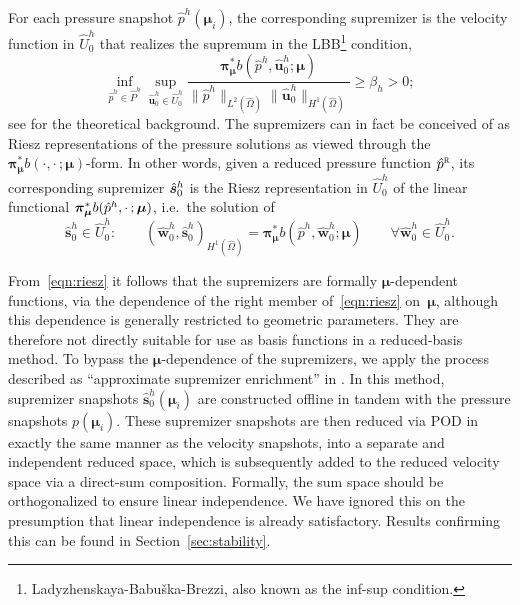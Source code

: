 \documentclass[onecolumn, twoside, a4paper, 11pt]{article}
\begin{document}
For each pressure snapshot $\hat{p}^h(\bm{\mu}_i)$, the corresponding supremizer is the
velocity function in $\hat{U}^h_0$ that realizes the supremum in the
LBB\footnote{Ladyzhenskaya-Babu\v{s}ka-Brezzi, also known as the inf-sup condition.} condition,
%
\begin{equation}
  \label{eqn:lbb}
  \inf_{\hat{p}^h \in \hat{P}^h} \sup_{\hat{\bm u}_0^h \in \hat{U}_0^h}
  \frac{\bm{\pi}^*_{\bm{\mu}}b(\hat{p}^h, \hat{\bm u}^h_0; \bm \mu)}
  {\|\hat{p}^h\|_{L^2(\hat{\Omega})} \|\hat{\bm{u}}_0^h\|_{H^1(\hat{\Omega})}}
  \geq \beta_h > 0;
\end{equation}
%
see \cite{Ballarin2015ssp} for the theoretical background.
%
The supremizers can in fact be conceived of as Riesz representations of the pressure solutions as
viewed through the $\bm{\pi}^*_{\bm{\mu}}b(\cdot,\cdot\,;\bm \mu)$-form. In other words,
given a reduced pressure function $\hat{p}^\textsc{r}$, its corresponding supremizer $\smash[t]{\hat{\bm s}^h_0}$ is
the Riesz representation in $\hat{U}_0^h$ of the linear functional
$\smash[t]{\bm{\pi}^*_{\bm{\mu}}b(\hat{p}^h,\cdot\,; \bm \mu)}$, i.e.~the solution of
%
\begin{equation}
  \label{eqn:riesz}
\hat{\bm s}^h_0\in  \hat{U}^h_0:
\qquad
  \left( \hat{\bm w}^h_0, \hat{\bm s}^h_0 \right)_{H^1(\hat{\Omega})} = \bm{\pi}^*_{\bm{\mu}}b(\hat{p}^h, \hat{\bm w}^h_0; \bm \mu)
  \qquad\forall\hat{\bm w}^h_0 \in \hat{U}^h_0.
\end{equation}
%

From~\eqref{eqn:riesz} it follows that the supremizers are formally $\bm{\mu}$\nobreakdash-dependent functions,
via the dependence of the right member of~\eqref{eqn:riesz} on~$\bm{\mu}$, although this dependence
is generally restricted to geometric parameters. They are therefore not directly suitable for use
as basis functions in a reduced-basis method. To bypass the $\bm{\mu}$\nobreakdash-dependence of the supremizers,
we apply the process described as ``approximate supremizer enrichment'' in
\cite[4.2.3]{Ballarin2015ssp}. In this method, supremizer snapshots $\hat{\bm s}^h_0(\bm\mu_i)$ are constructed
offline in tandem with the pressure snapshots $p(\bm \mu_i)$. These supremizer snapshots are then
reduced via POD in exactly the same manner as the velocity snapshots, into a separate and independent reduced space,
which is subsequently added to the reduced velocity space via a direct-sum composition. Formally,
the sum space should be orthogonalized to ensure linear independence. We have ignored this on the
presumption that linear independence is already satisfactory. Results confirming this can be found in
Section~\ref{sec:stability}.
\end{document}
